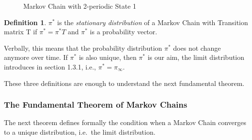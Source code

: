 \documentclass[12pt,english,a4paper,oneside]{article}
\theoremstyle{definition}
\newtheorem{definition}{Definition}[section]
\theoremstyle{definition}
\theoremstyle{definition}
\theoremstyle{definition}
\theoremstyle{remark}
\begin{document}
\begin{figure}[H]
\label{fig:ex3}
\centering

  
  \caption{Markov Chain with 2-periodic State 1}

\end{figure}

\begin{definition}
$\pi^*$ is the \textit{stationary distribution} of a Markov Chain with Transition matrix T if $\pi^* = \pi^* T$ and $\pi^*$ is a probability vector.
\end{definition}

\noindent
Verbally, this means that the probability distribution \(\pi^*\) does not change anymore over time. If \(\pi^*\) is also unique, then \(\pi^*\) is our aim, the limit distribution introduces in section 1.3.1, i.e., \(\pi^*=\pi_{\infty}\).

These three definitions are enough to understand the next fundamental theorem.

\hypertarget{the-fundamental-theorem-of-markov-chains}{%
\subsubsection{The Fundamental Theorem of Markov Chains}\label{the-fundamental-theorem-of-markov-chains}}

The next theorem defines formally the condition when a Markov Chain converges to a unique distribution, i.e.~the limit distribution.
\end{document}
